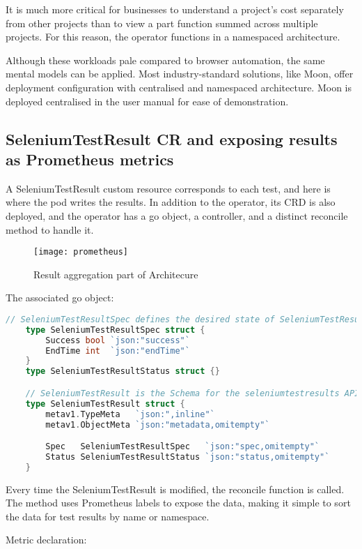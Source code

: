 It is much more critical for businesses to understand a project's cost separately from other projects than to view a part function summed across multiple projects. For this reason, the operator functions in a  namespaced architecture.

Although these workloads pale compared to browser automation, the same mental models can be applied. Most industry-standard solutions, like Moon, offer deployment configuration with centralised and namespaced architecture. Moon is deployed centralised in the user manual for ease of demonstration.

\subsection{SeleniumTestResult CR and exposing results as Prometheus metrics}

A SeleniumTestResult custom resource corresponds to each test, and here is where the pod writes the results. In addition to the operator, its CRD is also deployed, and the operator has a go object, a controller, and a distinct reconcile method to handle it.

\begin{figure}[H]
	\centering
	\texttt{[image: prometheus]}
	\label{fig:prometheus}
	\caption{Result aggregation part of Architecure}
\end{figure}

The associated go object:
\begin{lstlisting}[language={Go}]
	// SeleniumTestResultSpec defines the desired state of SeleniumTestResult
	type SeleniumTestResultSpec struct {
		Success bool `json:"success"`
		EndTime int  `json:"endTime"`
	}
	type SeleniumTestResultStatus struct {}

	// SeleniumTestResult is the Schema for the seleniumtestresults API
	type SeleniumTestResult struct {
		metav1.TypeMeta   `json:",inline"`
		metav1.ObjectMeta `json:"metadata,omitempty"`

		Spec   SeleniumTestResultSpec   `json:"spec,omitempty"`
		Status SeleniumTestResultStatus `json:"status,omitempty"`
	}
\end{lstlisting}

Every time the SeleniumTestResult is modified, the reconcile function is called. The method uses Prometheus labels to expose the data, making it simple to sort the data for test results by name or namespace.

Metric declaration:

